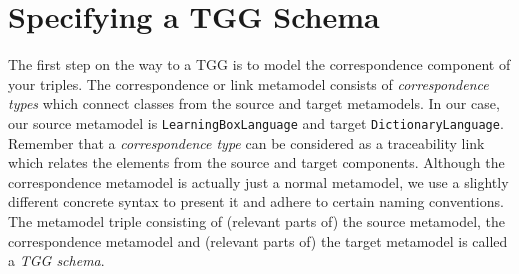 \section{Specifying a TGG Schema}

The first step on the way to a TGG is to model the correspondence component of your triples.
The correspondence or link metamodel consists of \emph{correspondence types} which connect classes from the source and target metamodels.
In our case, our source metamodel is \texttt{LearningBoxLanguage} and target \texttt{DictionaryLanguage}.
Remember that a \emph{correspondence type} can be considered as a traceability link which relates the elements from the source and target components.
Although the correspondence metamodel is actually just a normal metamodel, we use a slightly different concrete syntax to present it and adhere to certain naming conventions.
The metamodel triple consisting of (relevant parts of) the source metamodel, the correspondence metamodel and (relevant parts of) the target metamodel is called a \emph{TGG schema}. 


